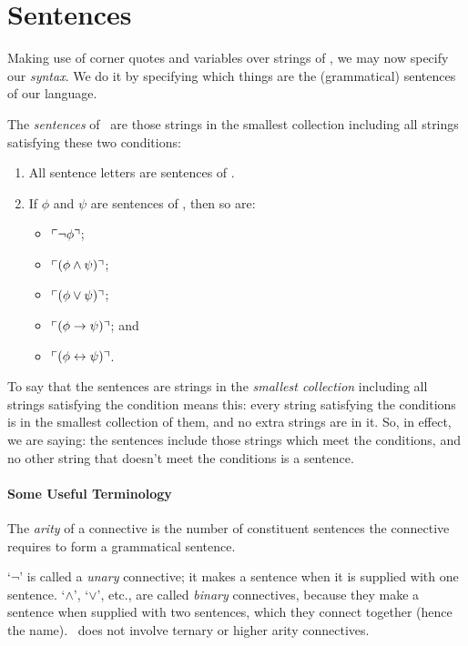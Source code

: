\section{Sentences}

Making use of corner quotes and variables over strings of \lone, we may now specify our \emph{syntax}. We do it by specifying which things are the (grammatical) sentences of our language.
	\begin{definition}
		\label{lone} The \emph{sentences} of \lone\ are those strings in the smallest collection including all strings satisfying these two conditions:
		\begin{enumerate}
			\item All sentence letters are sentences of \lone.
			\item If $\phi$ and $\psi$ are sentences of \lone, then so are: \begin{itemize}
				\item $\ulcorner \neg \phi \urcorner$;
				\item $\ulcorner (\phi \wedge \psi) \urcorner$;
				\item $\ulcorner (\phi \vee \psi) \urcorner$;
				\item $\ulcorner (\phi \to \psi) \urcorner$; and
				\item $\ulcorner (\phi \leftrightarrow \psi) \urcorner$. 
			\end{itemize}
		\end{enumerate} 
	\end{definition}
To say that the sentences are strings in the \emph{smallest collection} including all strings satisfying the condition means this: every string satisfying the conditions is in the smallest collection of them, and no extra strings are in it. So, in effect, we are saying: the sentences include those strings which meet the conditions, and no other string that doesn't meet the conditions is a sentence. 

\paragraph{Some Useful Terminology } \begin{definition}[Arity]
	The \emph{arity} of a connective is the number of constituent sentences the connective requires to form a grammatical sentence.
\end{definition} `$\neg$' is called a \emph{unary} connective; it makes a sentence when it is supplied with one sentence. `$\wedge$', `$\vee$', etc., are called \emph{binary} connectives, because they make a sentence when supplied with two sentences, which they connect together (hence the name). \lone\ does not involve ternary or higher arity connectives. 

